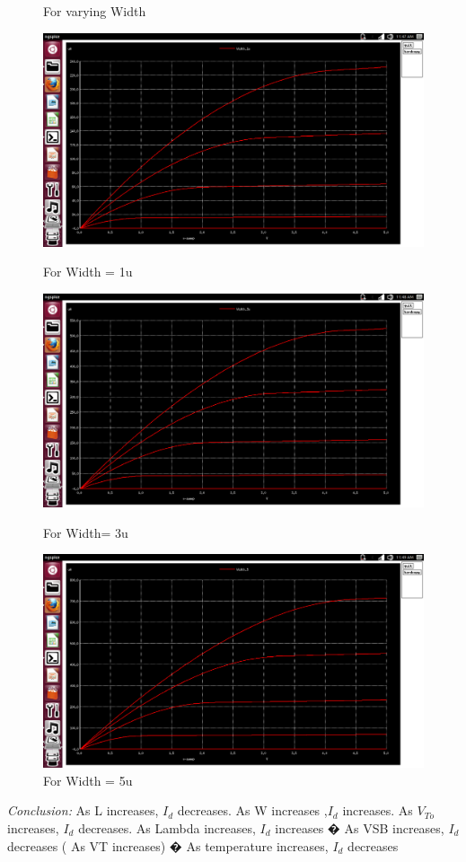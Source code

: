 \documentclass[12pt,a4paper]{article}
\begin{document}
\begin{center}
\begin{figure}[!ht]
\centering
\caption[Short]{For varying Width}
\includegraphics[scale=0.29]{Width_1a.png}
\caption[Short]{For  Width = 1u}
\includegraphics[scale=0.29]{Width_1b.png}
\caption[Short]{For  Width= 3u}
\includegraphics[scale=0.29]{Width_1c.png}
\caption[Short]{For Width = 5u}
\end{figure}
  
\vspace{3pt}
\clearpage
\textit{Conclusion:} As L increases, $I_d$ decreases. As W increases ,$I_d$ increases. As $V_{To}$ increases, $I_d$ decreases. As Lambda increases, $I_d$ increases � As VSB increases, $I_d$ decreases ( As VT increases) � As temperature increases, $I_d$ decreases 
\vspace{3pt}
\end{center}
\end{document}
